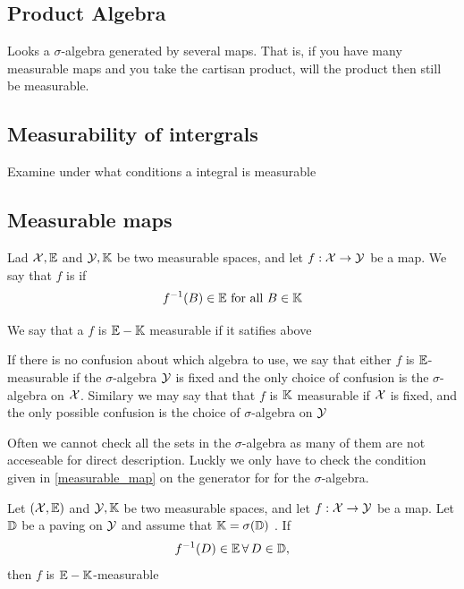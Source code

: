\subsection{Product Algebra} %
\label{ssub:product_algebra}
Looks a \(\sigma\)-algebra generated by several maps. That is, if you have many measurable maps and you take the cartisan product, will the product then still be measurable.
\subsection{Measurability of intergrals} %
\label{sub:measurability_of_intergrals}
Examine under what conditions a integral is measurable
\subsection{Measurable maps} %
\label{sub:measurable_maps}
\begin{defn}\label{measurable_map}
Lad \({\mathcal{X}},{\mathbb{E}}\) and \({\mathcal{Y}},{\mathbb{K}}\) be two measurable spaces, and let \(f:{\mathcal{X}} \rightarrow {\mathcal{Y}}\) be a map. We say that \(f\) is  if
\[
  f^{-1}(B)\in{\mathbb{E}} \text{ for all } B\in{\mathbb{K}}
\]
\end{defn}
\begin{rem}
We say that a \(f\) is \({\mathbb{E}}-{\mathbb{K}}\) measurable if it satifies above
\end{rem}
\begin{rem}
If there is no confusion about which algebra to use, we say that either \(f\) is \({\mathbb{E}}\)-measurable if the \(\sigma\)-algebra \({\mathcal{Y}}\) is fixed and the only choice of confusion is the \(\sigma\)-algebra on \({\mathcal{X}}\). Similary we may say that that \(f\) is \({\mathbb{K}}\) measurable if \({\mathcal{X}}\) is fixed, and the only possible confusion is the choice of \(\sigma\)-algebra on \({\mathcal{Y}}\)
\end{rem}
Often we cannot check all the sets in the \(\sigma\)-algebra as many of them are not acceseable for direct description. Luckly we only have to check the condition given in \cref{measurable_map} on the generator for for the \(\sigma\)-algebra.

\begin{lem}
Let \(({\mathcal{X}},{\mathbb{E}})\) and \({\mathcal{Y}},{\mathbb{K}}\) be two measurable spaces, and let \(f:{\mathcal{X}} \rightarrow {\mathcal{Y}}\) be a map. Let \({\mathbb{D}}\) be a paving on \({\mathcal{Y}}\) and assume that \({\mathbb{K}}=\sigma({\mathbb{D}})\) . If
\[
  f^{-1}(D)\in{\mathbb{E}}\, \forall\, D\in{\mathbb{D}},
\]
then \(f\) is \({\mathbb{E}}-{\mathbb{K}}\)-measurable
\end{lem}

